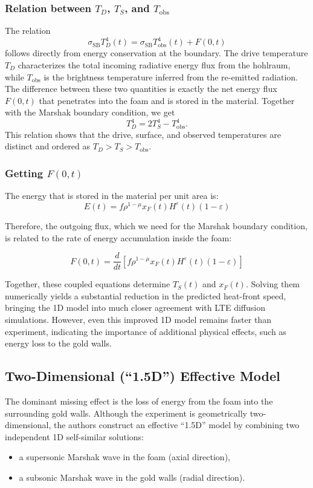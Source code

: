 \documentclass{article}
\begin{document}
\subsubsection*{Relation between $T_D$, $T_S$, and $T_{\mathrm{obs}}$}

The relation
\[
\sigma_{\mathrm{SB}}T_{D}^4(t)
= \sigma_{\mathrm{SB}}T_{\mathrm{obs}}^4(t)+F(0,t)
\]
follows directly from energy conservation at the boundary.
The drive temperature $T_D$ characterizes the total incoming radiative
energy flux from the hohlraum, while $T_{\mathrm{obs}}$ is the brightness
temperature inferred from the re-emitted radiation.
The difference between these two quantities is exactly the net energy flux
$F(0,t)$ that penetrates into the foam and is stored in the material. Together with the Marshak boundary condition, we get
\[
T_D^4 = 2T_S^4 - T_{\mathrm{obs}}^4.
\]
This relation shows that the drive, surface, and observed temperatures are
distinct and ordered as $T_D>T_S>T_{\mathrm{obs}}$.

\subsubsection*{Getting $F(0,t)$}

The energy that is stored in the material per unit area is: 
\[
E(t) = f \rho^{1-\mu} x_F(t) H^{\varepsilon}(t)(1-\varepsilon)
\]

Therefore, the outgoing flux, which we need for the Marshak boundary condition, is related to the rate of energy accumulation inside the foam:

\[
F(0,t) = \frac{d}{dt}
\left[
f \rho^{1-\mu} x_F(t) H^{\varepsilon}(t)(1-\varepsilon)
\right]
\]

Together, these coupled equations determine $T_S(t)$ and $x_F(t)$.
Solving them numerically yields a substantial reduction
in the predicted heat-front speed,
bringing the 1D model into much closer agreement with
LTE diffusion simulations. However, even this improved 1D model remains faster than experiment, indicating the importance of additional physical effects, such as energy loss to the gold walls.

\subsection{Two-Dimensional (``1.5D'') Effective Model}

The dominant missing effect is the loss of energy from the foam
into the surrounding gold walls.
Although the experiment is geometrically two-dimensional,
the authors construct an effective ``1.5D'' model
by combining two independent 1D self-similar solutions:
\begin{itemize}
\item a supersonic Marshak wave in the foam (axial direction),
\item a subsonic Marshak wave in the gold walls (radial direction).
\end{itemize}
\end{document}
